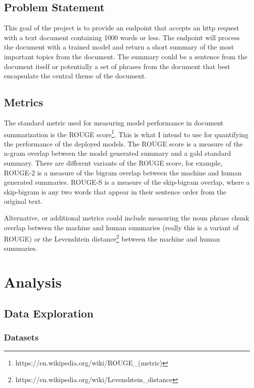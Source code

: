 \documentclass{article}
\begin{document}
\subsection{Problem Statement}

This goal of the project is to provide an endpoint that accepts an http request
with a text document containing 1000 words or less. The endpoint will process
the document with a trained model and return a short summary of the most
important topics from the document. The summary could be a sentence from the
document itself or potentially a set of phrases from the document that best
encapsulate the central theme of the document.

\subsection{Metrics}

The standard metric used for measuring model performance in document
summarization is the ROUGE
score\footnote{https://en.wikipedia.org/wiki/ROUGE\_(metric)}.
This is what I intend to use for quantifying the performance of the deployed
models. The ROUGE score is a measure of the n-gram overlap between the model
generated summary and a gold standard summary. There are different variants of
the ROUGE score, for example, ROUGE-2 is a measure of the bigram overlap between
the machine and human generated summaries. ROUGE-S is a measure of the
skip-bigram overlap, where a skip-bigram is any two words that appear in their
sentence order from the original text.

Alternative, or additional metrics could include measuring the noun phrase chunk
overlap between the machine and human summaries (really this is a variant of
ROUGE) or the Levenshtein
distance\footnote{https://en.wikipedia.org/wiki/Levenshtein\_distance} between
the machine and human summaries.

\section{Analysis}

\subsection{Data Exploration}

\subsubsection{Datasets}
\end{document}
